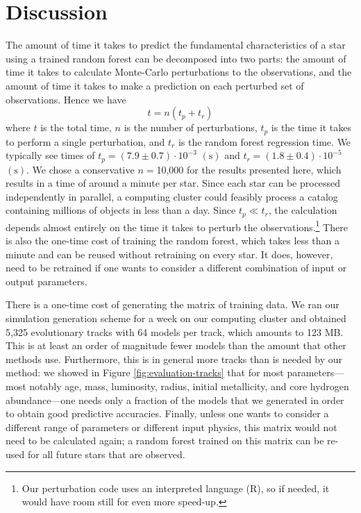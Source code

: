 \documentclass[twocolumn,twocolappendix]{aastex6}
\begin{document}
\section{Discussion}
The amount of time it takes to predict the fundamental characteristics of a star using a trained random forest can be decomposed into two parts: the amount of time it takes to calculate Monte-Carlo perturbations to the observations, and the amount of time it takes to make a prediction on each perturbed set of observations. Hence we have
\begin{equation}
    t = n(t_p + t_r)
\end{equation}
where $t$ is the total time, $n$ is the number of perturbations, $t_p$ is the time it takes to perform a single perturbation, and $t_r$ is the random forest regression time. We typically see times of $t_p = (7.9 \pm 0.7) \cdot 10^{-3}$ $(\si{\s})$ and $t_r = (1.8 \pm 0.4) \cdot 10^{-5}$ $(\si{\s})$. We chose a conservative $n=$10,000 for the results presented here, which results in a time of around a minute per star. Since each star can be processed independently in parallel, a computing cluster could feasibly process a catalog containing millions of objects in less than a day. Since $t_p \ll t_r$, the calculation depends almost entirely on the time it takes to perturb the observations.\footnote{Our perturbation code uses an interpreted language (R), so if needed, it would have room still for even more speed-up.} There is also the one-time cost of training the random forest, which takes less than a minute and can be reused without retraining on every star. It does, however, need to be retrained if one wants to consider a different combination of input or output parameters. 

There is a one-time cost of generating the matrix of training data. We ran our simulation generation scheme for a week on our computing cluster and obtained 5,325 evolutionary tracks with 64 models per track, which amounts to 123 MB. This is at least an order of magnitude fewer models than the amount that other methods use. Furthermore, this is in general more tracks than is needed by our method: we showed in Figure \ref{fig:evaluation-tracks} that for most parameters---most notably age, mass, luminosity, radius, initial metallicity, and core hydrogen abundance---one needs only a fraction of the models that we generated in order to obtain good predictive accuracies. Finally, unless one wants to consider a different range of parameters or different input physics, this matrix would not need to be calculated again; a random forest trained on this matrix can be re-used for all future stars that are observed. 
\end{document}
